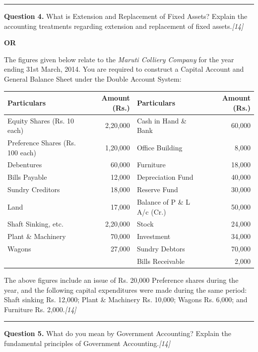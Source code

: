 \documentclass[11pt,a4paper]{article}
\newcommand{\pts}[1]{\hfill   \textit{[#1]}}
\begin{document}
\medskip\rule{\linewidth}{0.2pt}

\pagebreak




\noindent   \textbf{Question 4.}
What is Extension and Replacement of Fixed Assets? Explain the accounting treatments regarding extension and replacement of fixed assets.\pts{14}

\centerline{   \textbf{OR}}

The figures given below relate to the   \textit{Maruti Colliery Company} for the year ending 31st March, 2014. You are required to construct a Capital Account and General Balance Sheet under the Double Account System:


\begin{center}
\footnotesize

\begin{tabular}{|l|r||l|r|}
\hline
   \textbf{Particulars} &   \textbf{Amount (Rs.)} &   \textbf{Particulars} &   \textbf{Amount (Rs.)} \\
\hline
Equity Shares (Rs. 10 each) & 2,20,000 & Cash in Hand \& Bank & 60,000 \\
Preference Shares (Rs. 100 each) & 1,20,000 & Office Building & 8,000 \\
Debentures & 60,000 & Furniture & 18,000 \\
Bills Payable & 12,000 & Depreciation Fund & 40,000 \\
Sundry Creditors & 18,000 & Reserve Fund & 30,000 \\
Land & 17,000 & Balance of P \& L A/c (Cr.) & 50,000 \\
Shaft Sinking, etc. & 2,20,000 & Stock & 24,000 \\
Plant \& Machinery & 70,000 & Investment & 34,000 \\
Wagons & 27,000 & Sundry Debtors & 70,000 \\
& & Bills Receivable & 2,000 \\
\hline
\end{tabular}
\end{center}

The above figures include an issue of Rs. 20,000 Preference shares during the year, and the following capital expenditures were made during the same period: Shaft sinking Rs. 12,000; Plant \& Machinery Rs. 10,000; Wagons Rs. 6,000; and Furniture Rs. 2,000.\pts{14}

\medskip\rule{\linewidth}{0.2pt}




\noindent   \textbf{Question 5.}
What do you mean by Government Accounting? Explain the fundamental principles of Government Accounting.\pts{14}
\end{document}

